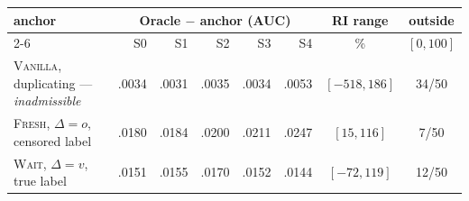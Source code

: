 \begin{tabular}{lrrrrrcc}
\toprule
anchor & \multicolumn{5}{c}{Oracle $-$ anchor (AUC)} & RI range & outside\\
\cmidrule(lr){2-6}
 & S0 & S1 & S2 & S3 & S4 & \% & $[0,100]$\\
\midrule
\textsc{Vanilla}, duplicating --- \emph{inadmissible} & .0034 & .0031 & .0035 & .0034 & .0053 & $[-518, 186]$ & 34/50\\
\textsc{Fresh}, $\Delta{=}o$, censored label & .0180 & .0184 & .0200 & .0211 & .0247 & $[15, 116]$ & 7/50\\
\textsc{Wait}, $\Delta{=}v$, true label & .0151 & .0155 & .0170 & .0152 & .0144 & $[-72, 119]$ & 12/50\\
\bottomrule
\end{tabular}
